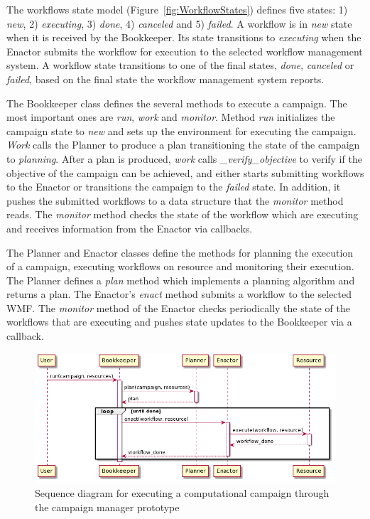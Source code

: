 The workflows state model  (Figure~\ref{fig:WorkflowStates}) defines five states: 1) \textit{new}, 2) \textit{executing}, 3) \textit{done}, 4) \textit{canceled} and 5) \textit{failed}.
A workflow is in \textit{new} state when it is received by the Bookkeeper.
Its state transitions to \textit{executing} when the Enactor submits the workflow for execution to the selected workflow management system.
A workflow state transitions to one of the final states,  \textit{done}, \textit{canceled} or \textit{failed}, based on the final state the workflow management system reports.

The Bookkeeper class defines the several methods to execute a campaign.
The most important ones are \textit{run}, \textit{work} and \textit{monitor}.
Method \textit{run} initializes the campaign state to \textit{new} and sets up the environment for executing the campaign.
\textit{Work} calls the Planner to produce a plan transitioning the state of the campaign to \textit{planning}.
After a plan is produced, \textit{work} calls \textit{\_verify\_objective} to verify if the objective of the campaign can be achieved, and either starts submitting workflows to the Enactor or transitions the campaign to the \textit{failed} state.
In addition, it pushes the submitted workflows to a data structure that the \textit{monitor} method reads.
The \textit{monitor} method checks the state of the workflow which are executing and receives information from the Enactor via callbacks.

The Planner and Enactor classes define the methods for planning the execution of a campaign, executing workflows on resource and monitoring their execution.
The Planner defines a \textit{plan} method which implements a planning algorithm and returns a plan.
The Enactor's \textit{enact} method submits a workflow to the selected WMF.
The \textit{monitor} method of the Enactor checks periodically the state of the workflows that are executing and pushes state updates to the Bookkeeper via a callback.

\begin{figure}[t]
    \centering
    \includegraphics[width=.85\textwidth]{figures/manager/rcm_seq.png}
    \caption{Sequence diagram for executing a computational campaign through the campaign manager prototype}
    \label{fig:seq_diag}
\end{figure}

